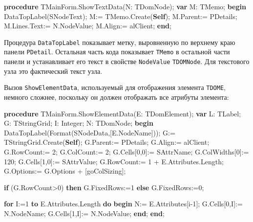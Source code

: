 \documentclass[
]{article}
\newenvironment{Shaded}{}{}
\newcommand{\DataTypeTok}[1]{\textcolor[rgb]{0.56,0.13,0.00}{#1}}
\newcommand{\DecValTok}[1]{\textcolor[rgb]{0.25,0.63,0.44}{#1}}
\newcommand{\KeywordTok}[1]{\textcolor[rgb]{0.00,0.44,0.13}{\textbf{#1}}}
\newcommand{\NormalTok}[1]{#1}
\begin{document}
\begin{Shaded}
\begin{Highlighting}[]
\KeywordTok{procedure}\NormalTok{ TMainForm.ShowTextData(N: TDomNode);}
\KeywordTok{var}
\NormalTok{  M: TMemo;}
\KeywordTok{begin}
\NormalTok{  DataTopLabel(SNodeText);}
\NormalTok{  M:= TMemo.Create(}\KeywordTok{Self}\NormalTok{);}
\NormalTok{  M.Parent:= PDetails;}
\NormalTok{  M.Lines.}\DataTypeTok{Text}\NormalTok{:= N.NodeValue;}
\NormalTok{  M.Align:= alClient;}
\KeywordTok{end}\NormalTok{;}
\end{Highlighting}
\end{Shaded}

Процедура \texttt{DataTopLabel} показывает метку, выровненную по
верхнему краю панели \texttt{PDetail}. Остальная часть кода показывает
\texttt{TMemo} в остальной части панели и устанавливает его текст в
свойстве \texttt{NodeValue} \texttt{TDOMNode}. Для текстового узла это
фактический текст узла.

Вызов \texttt{ShowElementData}, используемый для отображения элемента
\texttt{TDOME}, немного сложнее, поскольку он должен отображать все
атрибуты элемента:

\begin{Shaded}
\begin{Highlighting}[]
\KeywordTok{procedure}\NormalTok{ TMainForm.ShowElementData(E: TDomElement);}
\KeywordTok{var}
\NormalTok{  L: TLabel;}
\NormalTok{  G: TStringGrid;}
\NormalTok{  I: }\DataTypeTok{Integer}\NormalTok{;}
\NormalTok{  N: TDomNode;}
\KeywordTok{begin}
\NormalTok{  DataTopLabel(Format(SNodeData,[E.NodeName]));}
\NormalTok{  G:= TStringGrid.Create(}\KeywordTok{Self}\NormalTok{);}
\NormalTok{  G.Parent:= PDetails;}
\NormalTok{  G.Align:= alClient;}
\NormalTok{  G.RowCount:= }\DecValTok{2}\NormalTok{;}
\NormalTok{  G.ColCount:= }\DecValTok{2}\NormalTok{;}
\NormalTok{  G.Cells[}\DecValTok{0}\NormalTok{,}\DecValTok{0}\NormalTok{]:= SAttrName;}
\NormalTok{  G.ColWidths[}\DecValTok{0}\NormalTok{]:= }\DecValTok{120}\NormalTok{;}
\NormalTok{  G.Cells[}\DecValTok{1}\NormalTok{,}\DecValTok{0}\NormalTok{]:= SAttrValue;}
\NormalTok{  G.RowCount:= }\DecValTok{1}\NormalTok{ + E.Attributes.Length;}
\NormalTok{  G.Options:= G.Options + [goColSizing];}

  \KeywordTok{if}\NormalTok{ (G.RowCount\textgreater{}}\DecValTok{0}\NormalTok{) }\KeywordTok{then}
\NormalTok{    G.FixedRows:=}\DecValTok{1}
  \KeywordTok{else}
\NormalTok{    G.FixedRows:=}\DecValTok{0}\NormalTok{;}

  \KeywordTok{for}\NormalTok{ I:=}\DecValTok{1} \KeywordTok{to}\NormalTok{ E.Attributes.Length }\KeywordTok{do}
  \KeywordTok{begin}
\NormalTok{    N:= E.Attributes[i}\DecValTok{{-}1}\NormalTok{];}
\NormalTok{    G.Cells[}\DecValTok{0}\NormalTok{,I]:= N.NodeName;}
\NormalTok{    G.Cells[}\DecValTok{1}\NormalTok{,I]:= N.NodeValue;}
  \KeywordTok{end}\NormalTok{;}
\KeywordTok{end}\NormalTok{;}
\end{Highlighting}
\end{Shaded}
\end{document}
